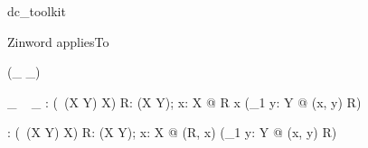 
\begin{zsection}
   \SECTION dc\_toolkit
\end{zsection}


Zinword \appliesTo appliesTo
\begin{zed}
   \relation (\_ \appliesTo \_)
\end{zed}

\begin{gendef}[X, Y]
   \_ \appliesTo~ \_ : \power(\power~(X \cross Y) \cross X)
\where
   \forall R: \power(X \cross Y); x: X @ R \appliesTo x \iff (\exists_1 y: Y @ (x, y) \in R)
\end{gendef} 

\begin{gendef}[X, Y]
   \appliesToNofix : \power(\power~(X \cross Y) \cross X)
\where
   \forall R: \power(X \cross Y); x: X @ (R, x) \in \appliesToNofix \iff (\exists_1 y: Y @ (x, y) \in R)
\end{gendef} 
